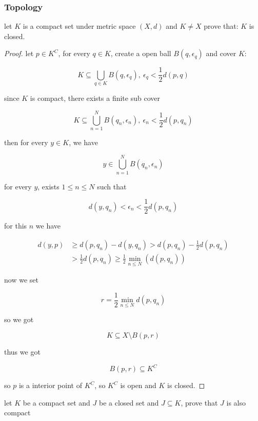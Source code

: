 \subsubsection{Topology}

\begin{exercise}
    let $K$ is a compact set under metric space $(X,d)$ and $K \ne X$ prove that: $K$ is closed.


\end{exercise}

\begin{proof}
    let $p \in K^C$, for every $q \in K$, create a open ball $B(q, \epsilon_q)$ and cover $K$:

    \[
        K \subseteq \bigcup_{q \in K} B(q, \epsilon_{q}), \: \epsilon_{q} < \frac{1}{2}d(p, q)
    \]

    since $K$ is compact, there exists a finite sub cover

    \[
    K \subseteq \bigcup_{n=1}^{N} B(q_n, \epsilon_{n}), \: \epsilon_{n} < \frac{1}{2}d(p, q_n)
    \]

    then for every $y \in K$, we have 

    \[
y \in \bigcup_{n=1}^{N} B(q_n, \epsilon_{n})
    \]

    for every $y$, exists $1 \le n \le N$ such that

    \[
        d(y, q_n) < \epsilon_n < \frac{1}{2}d(p, q_n)
    \]

    for this $n$ we have

    \begin{align*}
        d(y, p) &\ge d(p,q_n) - d(y, q_n) > d(p,q_n) - \frac{1}{2}d(p, q_n) \\
        & > \frac{1}{2}d(p, q_n) \ge \frac{1}{2}\min_{n \le N} \left( d(p, q_n) \right)
    \end{align*}

    now we set 

    \[
        r = \frac{1}{2}\min_{n \le N}d(p, q_n)
    \]


    so we got

    \[
        K \subseteq X \setminus B(p, r)
    \]

    thus we got

    \[
        B(p,r) \subseteq K^C
    \]

    so $p$ is a interior point of $K^C$, so $K^C$ is open and $K$ is closed.
\end{proof}

\begin{exercise}
    let $K$ be a compact set and $J$ be a closed set and $J \subseteq K$, prove that $J$ is also compact
\end{exercise}

